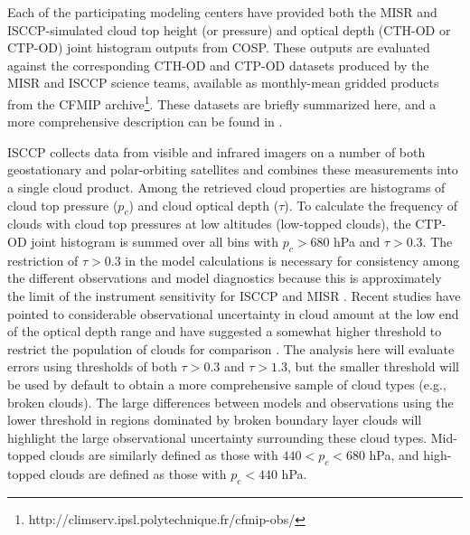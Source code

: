 Each of the participating modeling centers have provided both the MISR
and ISCCP-simulated cloud top height (or pressure) and optical depth
(CTH-OD or CTP-OD) joint histogram outputs from COSP. These outputs are
evaluated against the corresponding CTH-OD and CTP-OD datasets produced
by the MISR and ISCCP science teams, available as monthly-mean gridded
products from the CFMIP archive\footnote{http://climserv.ipsl.polytechnique.fr/cfmip-obs/}.
These datasets are briefly summarized here, and a more comprehensive
description can be found in \citet{marchand_et_al_2010}.

ISCCP collects data from visible and infrared imagers on a number of
both geostationary and polar-orbiting satellites and combines these
measurements into a single cloud product. Among the retrieved cloud
properties are histograms of cloud top pressure (\(p_c\)) and cloud
optical depth (\(\tau\)). To calculate the frequency of clouds with
cloud top pressures at low altitudes (low-topped clouds), the CTP-OD
joint histogram is summed over all bins with \(p_c > 680\) hPa and
\(\tau > 0.3\). The restriction of \(\tau > 0.3\) in the model
calculations is necessary for consistency among the different
observations and model diagnostics because this is approximately the
limit of the instrument sensitivity for ISCCP and MISR
\citep{marchand_et_al_2010}. Recent studies have pointed to considerable
observational uncertainty in cloud amount at the low end of the optical
depth range and have suggested a somewhat higher threshold to restrict
the population of clouds for comparison
\citep[e.g.,][]{pincus_et_al_2012, zhao_and_digirolamo_2006}. The
analysis here will evaluate errors using thresholds of both
\(\tau > 0.3\) and \(\tau > 1.3\), but the smaller threshold will be
used by default to obtain a more comprehensive sample of cloud types
(e.g., broken clouds). The large differences between models and
observations using the lower threshold in regions dominated by broken
boundary layer clouds will highlight the large observational uncertainty
surrounding these cloud types. Mid-topped clouds are similarly defined
as those with \(440 < p_c < 680\) hPa, and high-topped clouds are
defined as those with \(p_c < 440\) hPa.


